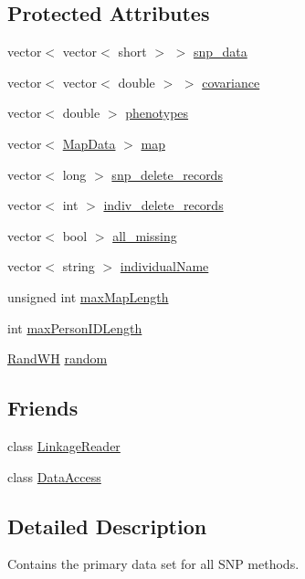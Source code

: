 \subsection*{Protected Attributes}
\begin{DoxyCompactItemize}
\item 
vector$<$ vector$<$ short $>$ $>$ \hyperlink{classSnpData_a485f4c48967669c1461fbed3ba32f98b}{snp\_\-data}
\item 
vector$<$ vector$<$ double $>$ $>$ \hyperlink{classSnpData_a26418125e4106520772b256d22b3a5c2}{covariance}
\item 
vector$<$ double $>$ \hyperlink{classSnpData_a355bd15fc7b63abdf6c0f5201c753e86}{phenotypes}
\item 
vector$<$ \hyperlink{structSnpData_1_1MapData}{MapData} $>$ \hyperlink{classSnpData_a603bf0f325e6372f3bd46046751dc4a3}{map}
\item 
vector$<$ long $>$ \hyperlink{classSnpData_ae90cb32821113584bc99241e760fdadb}{snp\_\-delete\_\-records}
\item 
vector$<$ int $>$ \hyperlink{classSnpData_a0b3e8c850f1bef514eb74c77011557e8}{indiv\_\-delete\_\-records}
\item 
vector$<$ bool $>$ \hyperlink{classSnpData_a6a43ad849a99b9ecffa9de59a876187e}{all\_\-missing}
\item 
vector$<$ string $>$ \hyperlink{classSnpData_a2c8efb31ae7abca0dffa3ae2e54b4eaa}{individualName}
\item 
unsigned int \hyperlink{classSnpData_a06d3ca0ba0949ae98c2b055c6f2402f9}{maxMapLength}
\item 
int \hyperlink{classSnpData_a3cf4a8a666a5eac6c78e68466b1858a7}{maxPersonIDLength}
\item 
\hyperlink{classRandWH}{RandWH} \hyperlink{classSnpData_afb0a89afa8922e9e20b4826ae5d5cd36}{random}
\end{DoxyCompactItemize}
\subsection*{Friends}
\begin{DoxyCompactItemize}
\item 
class \hyperlink{classSnpData_aeec22b22ec66cea36cae09979a36d40c}{LinkageReader}
\item 
class \hyperlink{classSnpData_a079f8f0072d4d2ed008a2486f38b3834}{DataAccess}
\end{DoxyCompactItemize}


\subsection{Detailed Description}
Contains the primary data set for all SNP methods.

